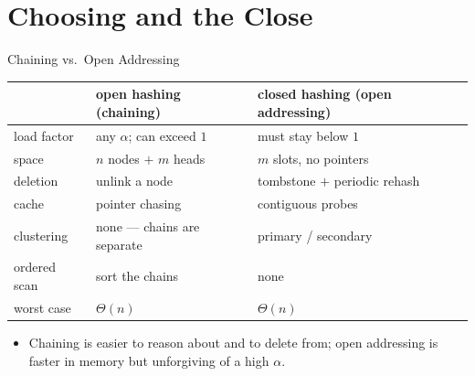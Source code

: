 \documentclass[aspectratio=169]{beamer}
\begin{document}

\section{Choosing and the Close}


\begin{frame}{Chaining vs.\ Open Addressing}
  \begin{center}
  {\footnotesize
  \begin{tabular}{p{3.2cm} p{4.4cm} p{4.4cm}}
    \toprule
    & \textbf{open hashing (chaining)} &
      \textbf{closed hashing (open addressing)} \\
    \midrule
    load factor & any $\alpha$; can exceed $1$ & must stay below $1$ \\
    space & $n$ nodes $+$ $m$ heads & $m$ slots, no pointers \\
    deletion & unlink a node & tombstone $+$ periodic rehash \\
    cache & pointer chasing & contiguous probes \\
    clustering & none --- chains are separate & primary / secondary \\
    ordered scan & sort the chains & none \\
    worst case & $\Theta(n)$ & $\Theta(n)$ \\
    \bottomrule
  \end{tabular}}
  \end{center}
  \begin{itemize}
    \item Chaining is easier to reason about and to delete from; open
      addressing is faster in memory but unforgiving of a high $\alpha$.
  \end{itemize}
\end{frame}
\end{document}
